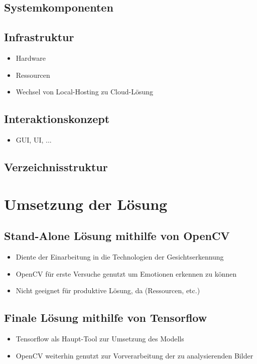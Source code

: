 \documentclass[12pt, a4paper]{scrbook}
\begin{document}
\subsection{Systemkomponenten}

\subsection{Infrastruktur}
\begin{itemize}
\item Hardware
\item Ressourcen
\item Wechsel von Local-Hosting zu Cloud-Lösung
\end{itemize}

\subsection{Interaktionskonzept}
\begin{itemize}
\item GUI, UI, ...
\end{itemize}

\subsection{Verzeichnisstruktur}


\section{Umsetzung der Lösung}

\subsection{Stand-Alone Lösung mithilfe von OpenCV}
\begin{itemize}
\item Diente der Einarbeitung in die Technologien der Gesichtserkennung
\item OpenCV für erste Versuche genutzt um Emotionen erkennen zu können
\item Nicht geeignet für produktive Lösung, da (Ressourcen, etc.)
\end{itemize}

\subsection{Finale Lösung mithilfe von Tensorflow}
\begin{itemize}
\item Tensorflow als Haupt-Tool zur Umsetzung des Modells
\item OpenCV weiterhin genutzt zur Vorverarbeitung der zu analysierenden Bilder
\end{itemize}
\end{document}

